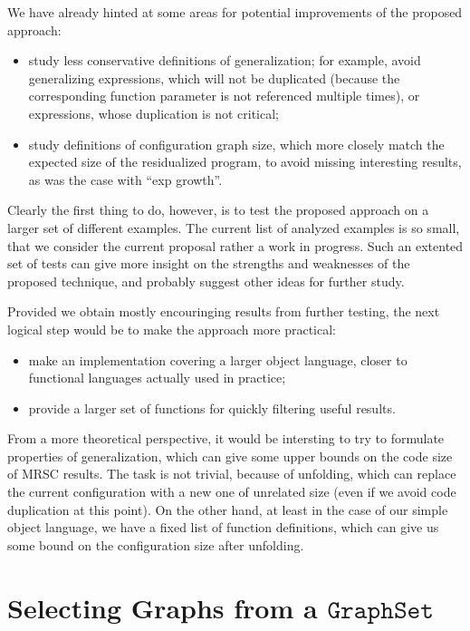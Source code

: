 \documentclass[submission,copyright,creativecommons]{eptcs}
\begin{document}
We have already hinted at some areas for potential improvements of the proposed approach:
\begin{itemize}
  \item study less conservative definitions of generalization; for example, avoid generalizing
    expressions, which will not be duplicated (because the corresponding function parameter is
    not referenced multiple times), or expressions, whose duplication is not critical;
  \item study definitions of configuration graph size, which more closely match the expected
    size of the residualized program, to avoid missing interesting results, as was the case
    with ``exp growth''.
\end{itemize}
Clearly the first thing to do, however, is to test the proposed approach on a larger set of
different examples.
The current list of analyzed examples is so small, that we consider the current proposal
rather a work in progress.
Such an extented set of tests can give more insight on the strengths and weaknesses of the
proposed technique, and probably suggest other ideas for further study.

Provided we obtain mostly encouringing results from further testing, the next logical 
step would be to make the approach more practical:
\begin{itemize}
  \item make an implementation covering a larger object language, closer to functional languages
    actually used in practice;
  \item provide a larger set of functions for quickly filtering useful results.
\end{itemize}

From a more theoretical perspective, it would be intersting to try to formulate properties
of generalization, which can give some upper bounds on the code size of MRSC results.
The task is not trivial, because of unfolding, which can replace the current configuration
with a new one of unrelated size (even if we avoid code duplication at this point).
On the other hand, at least in the case of our simple object language, we have a fixed
list of function definitions, which can give us some bound on the configuration size
after unfolding.




\appendix

\clearpage
\section{Selecting Graphs from a $\mathtt{GraphSet}$}\label{app:FilterGraphSet}
\end{document}
